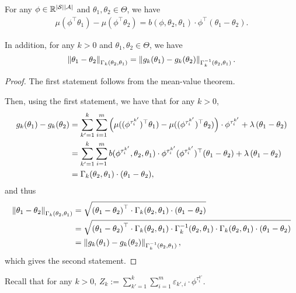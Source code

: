 \begin{lemma} \label{lemma:two_equalities}
	For any $\phi \in \mathbb{R}^{|\mathcal{S}||\mathcal{A}|}$ and $\theta_1,\theta_2 \in \Theta$, we have
	\begin{align*}
		\mu(\phi^\top \theta_1) - \mu(\phi^\top \theta_2) = b(\phi,\theta_2,\theta_1) \cdot \phi^\top (\theta_1-\theta_2) .
	\end{align*}
	
	In addition, for any $k>0$ and $\theta_1,\theta_2 \in \Theta$, we have
	\begin{align*}
		\left\| \theta_1-\theta_2 \right\|_{\Gamma_{k}(\theta_2,\theta_1)} = \left\|  g_k(\theta_1) - g_k(\theta_2)  \right\|_{\Gamma_{k}^{-1}(\theta_2,\theta_1)} .
	\end{align*}
\end{lemma}
\begin{proof}
	The first statement follows from the mean-value theorem.
	
	Then, using the first statement, we have that for any $k>0$,
	\begin{align*}
		g_k(\theta_1) - g_k(\theta_2) &= \sum_{k'=1}^{k} \sum_{i=1}^{m} \left( \mu( (\phi^{\tau^{k'}_i})^\top \theta_1 ) - \mu( (\phi^{\tau^{k'}_i})^\top \theta_2 ) \right) \cdot \phi^{\tau^{k'}_i} + \lambda \left(  \theta_1 - \theta_2  \right)
		\\
		&= \sum_{k'=1}^{k} \sum_{i=1}^{m} b(\phi^{\tau^{k'}_i},\theta_2,\theta_1) \cdot \phi^{\tau^{k'}_i} (\phi^{\tau^{k'}_i})^\top (\theta_1-\theta_2) + \lambda \left(  \theta_1 - \theta_2  \right)
		\\
		&= \Gamma_{k}(\theta_2,\theta_1) \cdot (\theta_1-\theta_2) ,
	\end{align*}
	and thus
	\begin{align*}
		\left\| \theta_1-\theta_2 \right\|_{\Gamma_{k}(\theta_2,\theta_1)} &= \sqrt{ \left( \theta_1-\theta_2 \right)^\top \cdot \Gamma_{k}(\theta_2,\theta_1) \cdot \left( \theta_1-\theta_2 \right)  }
		\\
		&= \sqrt{ \left( \theta_1-\theta_2 \right)^\top \cdot \Gamma_{k}(\theta_2,\theta_1) \cdot \Gamma_{k}^{-1}(\theta_2,\theta_1) \cdot \Gamma_{k}(\theta_2,\theta_1) \cdot \left( \theta_1-\theta_2 \right)  }
		\\
		&= \left\|  g_k(\theta_1) - g_k(\theta_2)  \right\|_{\Gamma_{k}^{-1}(\theta_2,\theta_1)} ,
	\end{align*}
	which gives the second statement.
\end{proof}

Recall that for any $k>0$, $Z_k := \sum_{k'=1}^{k} \sum_{i=1}^{m} \varepsilon_{k',i} \cdot \phi^{\tau^{k'}_i}$.

